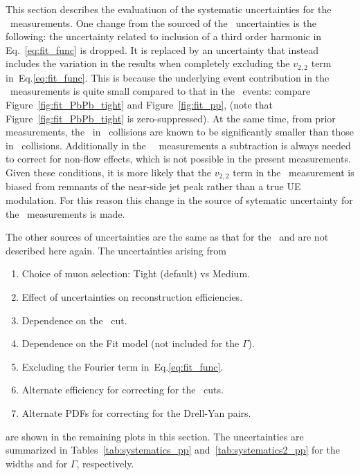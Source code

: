 This section describes the evaluatiuon of the systematic 
  uncertainties for the \pp\ measurements.
One change from the sourced of the \PbPb\ uncertainties is the following:
  the uncertainty related to inclusion of a third order harmonic in
  Eq.~\ref{eq:fit_func} is dropped.
It is replaced by an uncertainty that instead includes the variation 
  in the results when completely excluding 
	the $v_{2,2}$ term in~Eq.\eqref{eq:fit_func}.
This is because the underlying event contribution in the \pp\
  measurements is quite small compared to that in the \PbPb\ events:
  compare Figure~\ref{fig:fit_PbPb_tight} and Figure~\ref{fig:fit_pp},
	(note that Figure~\ref{fig:fit_PbPb_tight} is zero-suppressed).
At the same time, from prior measurements, the \vn\ in \pp\
  collisions are known to be significantly smaller than those
  in \PbPb\ collisions.
Additionally in the \pp\ \vn\ measurements a subtraction
  is always needed to correct for non-flow effects,
	which is not possible in the present measurements.
Given these conditions, it is more likely that the $v_{2,2}$ term
  in the \pp\ measurement is biased from remnants of the near-side 
	jet peak rather than a true UE modulation.
For this reason this change in the source of sytematic uncertainty
  for the \pp\ measurements is made.



The other sources of uncertainties are the same as that for the 
  \PbPb\ and are not described here again.
\iftoggle{IncludeYields}
{
  The luminosity uncertainty for the \pp\ data is 1.6\%.
  Trigger eff uncertainties and SF uncertainties for 
    the trigger are $\sim1$\% and included as overall uncertainties
    on the \pp\ C.S.
}{}
The uncertainties arising from
\begin{enumerate}
\item Choice of muon selection: Tight (default) vs Medium.
\item Effect of uncertainties on reconstruction efficiencies.
\item Dependence on the \Deta\ cut.
\item Dependence on the Fit model (not included for the $\Gamma$).
\item Excluding the Fourier term in~Eq.\eqref{eq:fit_func}.
\item Alternate efficiency for correcting for the \Mmumu\ cuts.
\item Alternate PDFs for correcting for the Drell-Yan pairs.
\end{enumerate}
  are shown in the remaining plots in this section.
The uncertainties are summarized in Tables~\ref{tab:systematics_pp}
  and~\ref{tab:systematics2_pp} for the widths and for $\Gamma$, respectively.

